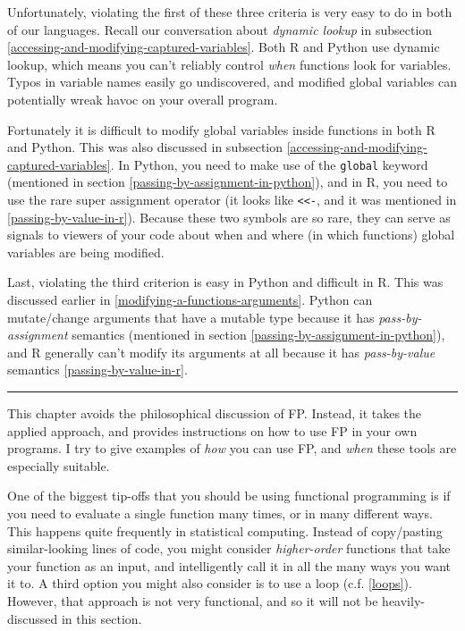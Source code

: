 \documentclass[12pt,krantz2]{krantz}
\begin{document}
Unfortunately, violating the first of these three criteria is very easy to do in both of our languages. Recall our conversation about \emph{dynamic lookup} in subsection \ref{accessing-and-modifying-captured-variables}. Both R and Python use dynamic lookup, which means you can't reliably control \emph{when} functions look for variables. Typos in variable names easily go undiscovered, and modified global variables can potentially wreak havoc on your overall program.

Fortunately it is difficult to modify global variables inside functions in both R and Python. This was also discussed in subsection \ref{accessing-and-modifying-captured-variables}. In Python, you need to make use of the \texttt{global} keyword (mentioned in section \ref{passing-by-assignment-in-python}), and in R, you need to use the rare super assignment operator (it looks like \texttt{\textless{}\textless{}-}, and it was mentioned in \ref{passing-by-value-in-r}). Because these two symbols are so rare, they can serve as signals to viewers of your code about when and where (in which functions) global variables are being modified.

Last, violating the third criterion is easy in Python and difficult in R. This was discussed earlier in \ref{modifying-a-functions-arguments}. Python can mutate/change arguments that have a mutable type because it has \emph{pass-by-assignment} semantics (mentioned in section \ref{passing-by-assignment-in-python}), and R generally can't modify its arguments at all because it has \emph{pass-by-value} semantics \ref{passing-by-value-in-r}.

\begin{center}\rule{0.5\linewidth}{0.5pt}\end{center}

This chapter avoids the philosophical discussion of FP. Instead, it takes the applied approach, and provides instructions on how to use FP in your own programs. I try to give examples of \emph{how} you can use FP, and \emph{when} these tools are especially suitable.

One of the biggest tip-offs that you should be using functional programming is if you need to evaluate a single function many times, or in many different ways. This happens quite frequently in statistical computing. Instead of copy/pasting similar-looking lines of code, you might consider \emph{higher-order} functions that take your function as an input, and intelligently call it in all the many ways you want it to. A third option you might also consider is to use a loop (c.f. \ref{loops}). However, that approach is not very functional, and so it will not be heavily-discussed in this section.
\end{document}
